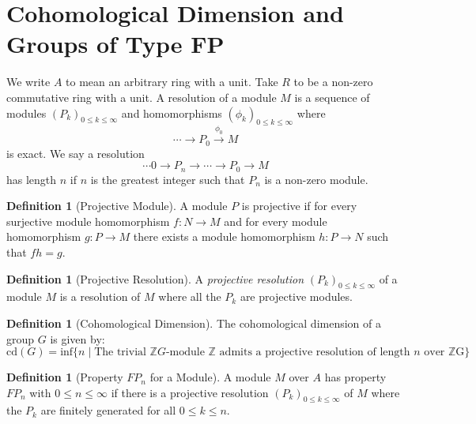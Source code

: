 \documentclass[12pt,parskip=full]{report}
\theoremstyle{plain}
\theoremstyle{definition}
\newtheorem{dfn}[thm]{Definition}
\begin{document}









\section{Cohomological Dimension and Groups of Type FP}


We write \(A\) to mean an arbitrary ring with a unit. Take \(R\) to be a non-zero commutative ring with a unit. A resolution of a module \(M\) is a sequence of modules \((P_k)_{0\leq k\leq \infty}\) and homomorphisms \((\phi_k)_{0\leq k\leq \infty}\) where \[\cdots \to P_0 \overset{\phi_0}{\to} M\] is exact. We say a resolution \[\cdots 0\to P_n\to \cdots\to P_0 \to M\] has length \(n\) if \(n\) is the greatest integer such that \(P_n\) is a non-zero module.

\begin{dfn}
    [Projective Module]
    A module \(P\) is projective if for every surjective module homomorphism \(f: N\to M\) and for every module homomorphism \(g: P\to M\) there exists a module homomorphism \(h: P\to N\) such that \(fh = g\).
\end{dfn}

\begin{dfn}
    [Projective Resolution]
    A \emph{projective resolution} \((P_k)_{0\leq k\leq \infty}\) of a module \(M\) is a resolution of \(M\) where all the \(P_k\) are projective modules.
\end{dfn}

\begin{dfn}
[Cohomological Dimension]
The cohomological dimension of a group \(G\) is given by:
\[
    \text{cd}(G) = \text{inf}\{n\mid\text{The trivial }\mathbb{Z}G\text{-module }\mathbb{Z}\text{ admits a projective resolution of length \(n\) over \(\mathbb{Z}\)G}\}
\]
\end{dfn}

\begin{dfn}
[Property \(FP_n\) for a Module]

A module \(M\) over \(A\) has property \(FP_n\) with \(0\leq n\leq \infty\) if there is a projective resolution \((P_k)_{0\leq k\leq \infty}\) of \(M\) where the \(P_k\) are finitely generated for all \(0\leq k\leq n\).
\end{dfn}
\end{document}
